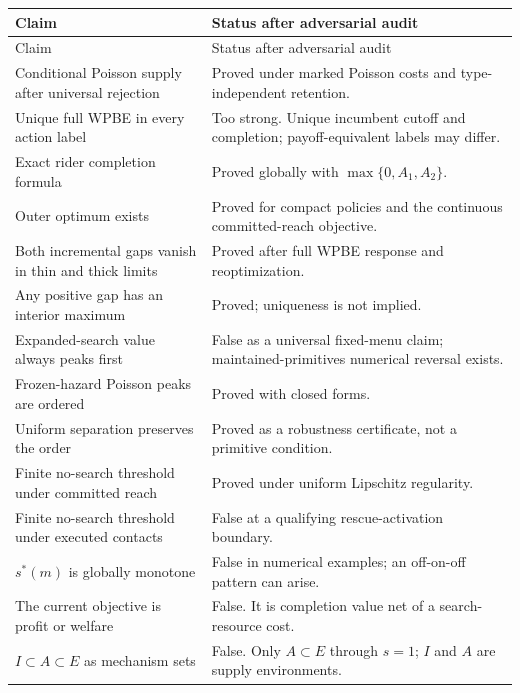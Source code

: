 \documentclass[11pt]{article}
\theoremstyle{definition}
\theoremstyle{remark}
\begin{document}
\begin{longtable}{@{}p{}p{}@{}}
\toprule
Claim & Status after adversarial audit \\
\midrule
\endfirsthead
\toprule
Claim & Status after adversarial audit \\
\midrule
\endhead
Conditional Poisson supply after universal rejection & Proved under marked
Poisson costs and type-independent retention. \\
Unique full WPBE in every action label & Too strong.  Unique incumbent cutoff
and completion; payoff-equivalent labels may differ. \\
Exact rider completion formula & Proved globally with
$\max\{0,A_1,A_2\}$. \\
Outer optimum exists & Proved for compact policies and the continuous
committed-reach objective. \\
Both incremental gaps vanish in thin and thick limits & Proved after full
WPBE response and reoptimization. \\
Any positive gap has an interior maximum & Proved; uniqueness is not implied. \\
Expanded-search value always peaks first & False as a universal fixed-menu
claim; maintained-primitives numerical reversal exists. \\
Frozen-hazard Poisson peaks are ordered & Proved with closed forms. \\
Uniform separation preserves the order & Proved as a robustness certificate,
not a primitive condition. \\
Finite no-search threshold under committed reach & Proved under uniform
Lipschitz regularity. \\
Finite no-search threshold under executed contacts & False at a qualifying
rescue-activation boundary. \\
$s^*(m)$ is globally monotone & False in numerical examples; an off-on-off
pattern can arise. \\
The current objective is profit or welfare & False.  It is completion value
net of a search-resource cost. \\
$I\subset A\subset E$ as mechanism sets & False.  Only $A\subset E$ through
$s=1$; $I$ and $A$ are supply environments. \\
\bottomrule
\end{longtable}
\end{document}
